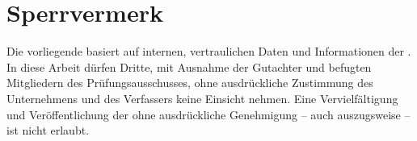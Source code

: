 \section*{Sperrvermerk}
Die vorliegende \varArbeit \space basiert auf internen, vertraulichen Daten und Informationen der \varUnternehmen. 
In diese Arbeit dürfen Dritte, mit Ausnahme der Gutachter und befugten Mitgliedern des Prüfungsausschusses, 
ohne ausdrückliche Zustimmung des Unternehmens und des Verfassers keine Einsicht nehmen. Eine Vervielfältigung 
und Veröffentlichung der \varArbeit \space ohne ausdrückliche Genehmigung – auch auszugsweise – ist nicht erlaubt.